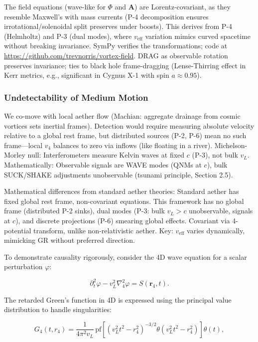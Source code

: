 The field equations (wave-like for $\Phi$ and $\mathbf{A}$) are Lorentz-covariant, as they resemble Maxwell's with mass currents (P-4 decomposition ensures irrotational/solenoidal split preserves under boosts). This derives from P-4 (Helmholtz) and P-3 (dual modes), where $v_{\text{eff}}$ variation mimics curved spacetime without breaking invariance. SymPy verifies the transformations; code at \url{https://github.com/trevnorris/vortex-field}. DRAG as observable rotation preserves invariance; ties to black hole frame-dragging (Lense-Thirring effect in Kerr metrics, e.g., significant in Cygnus X-1 with spin $a \approx 0.95$).

\subsubsection{Undetectability of Medium Motion}

We co-move with local aether flow (Machian: aggregate drainage from cosmic vortices sets inertial frames). Detection would require measuring absolute velocity relative to a global rest frame, but distributed sources (P-2, P-6) mean no such frame---local $v_4$ balances to zero via inflows (like floating in a river). Michelson-Morley null: Interferometers measure Kelvin waves at fixed $c$ (P-3), not bulk $v_L$. Mathematically: Observable signals are WAVE modes (QNMs at $c$), bulk SUCK/SHAKE adjustments unobservable (tsunami principle, Section 2.5).

Mathematical differences from standard aether theories: Standard aether has fixed global rest frame, non-covariant equations. This framework has no global frame (distributed P-2 sinks), dual modes (P-3: bulk $v_L > c$ unobservable, signals at $c$), and discrete projections (P-6) smearing global effects. Covariant via 4-potential transform, unlike non-relativistic aether. Key: $v_{\text{eff}}$ varies dynamically, mimicking GR without preferred direction.

To demonstrate causality rigorously, consider the 4D wave equation for a scalar perturbation $\varphi$:

\begin{equation}
\partial_t^2 \varphi - v_L^2 \nabla_4^2 \varphi = S(\mathbf{r}_4, t).
\end{equation}

The retarded Green's function in 4D is expressed using the principal value distribution to handle singularities:

\begin{equation}
G_4(t, r_4) = \frac{1}{4 \pi^2 v_L} \, \text{pf} \left[ (v_L^2 t^2 - r_4^2)^{-3/2} \theta(v_L^2 t^2 - r_4^2) \right] \theta(t),
\end{equation}

